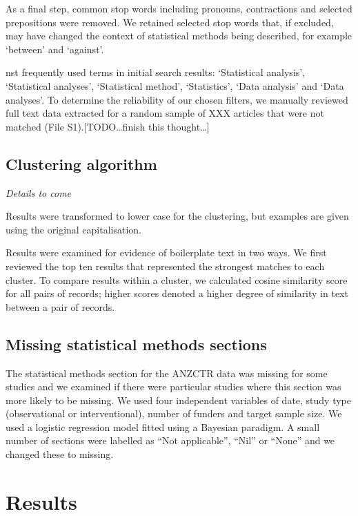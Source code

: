 \documentclass[12pt]{article}
\begin{document}
As a final step, common stop words including pronouns, contractions and
selected prepositions were removed. We retained selected stop words
that, if excluded, may have changed the context of statistical methods
being described, for example `between' and `against'.

nst frequently used terms in initial search results: `Statistical
analysis', `Statistical analyses', `Statistical method', `Statistics',
`Data analysis' and `Data analyses'. To determine the reliability of our
chosen filters, we manually reviewed full text data extracted for a
random sample of XXX articles that were not matched (File
S1).{[}TODO\ldots finish this thought\ldots{]}

\subsection{Clustering algorithm}

\emph{Details to come}

Results were transformed to lower case for the clustering, but examples
are given using the original capitalisation.

Results were examined for evidence of boilerplate text in two ways. We
first reviewed the top ten results that represented the strongest
matches to each cluster. To compare results within a cluster, we
calculated cosine similarity score for all pairs of records; higher
scores denoted a higher degree of similarity in text between a pair of
records.

\subsection{Missing statistical methods sections}

The statistical methods section for the ANZCTR data was missing for some
studies and we examined if there were particular studies where this
section was more likely to be missing. We used four independent
variables of date, study type (observational or interventional), number
of funders and target sample size. We used a logistic regression model
fitted using a Bayesian paradigm. A small number of sections were
labelled as ``Not applicable'', ``Nil'' or ``None'' and we changed these
to missing.

\hypertarget{results}{%
\section{Results}\label{results}}
\end{document}
